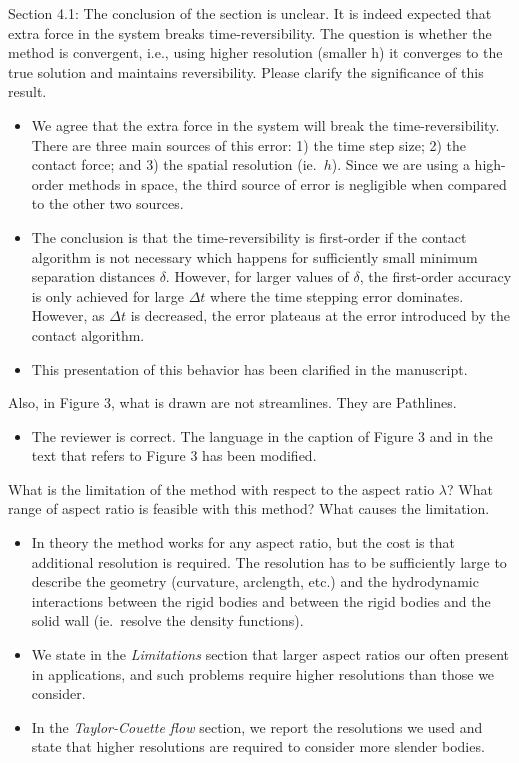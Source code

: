 \documentclass[11pt]{article}
\newcommand{\comment}[1]{{\color{blue} #1}}
\begin{document}
\noindent
\comment{Section 4.1: The conclusion of the section is unclear.  It is
  indeed expected that extra force in the system breaks
  time-reversibility.  The question is whether the method is convergent,
  i.e., using higher resolution (smaller h) it converges to the true
  solution and maintains reversibility.  Please clarify the significance
of this result.}
\begin{itemize}
  \item We agree that the extra force in the system will break the
    time-reversibility.  There are three main sources of this error: 1)
    the time step size; 2) the contact force; and 3) the spatial
    resolution (ie.~$h$).  Since we are using a high-order methods in
    space, the third source of error is negligible when compared to the
    other two sources.

  \item The conclusion is that the time-reversibility is first-order if
    the contact algorithm is not necessary which happens for
    sufficiently small minimum separation distances $\delta$.  However,
    for larger values of $\delta$, the first-order accuracy is only
    achieved for large $\Delta t$ where the time stepping error
    dominates.  However, as $\Delta t$ is decreased, the error plateaus
    at the error introduced by the contact algorithm.

  \item This presentation of this behavior has been clarified in the
    manuscript.
\end{itemize}

\noindent
\comment{Also, in Figure 3, what is drawn are not streamlines.  They are
Pathlines.}
\begin{itemize}
  \item The reviewer is correct.  The language in the caption of Figure
    3 and in the text that refers to Figure 3 has been modified.
\end{itemize}


\noindent
\comment{What is the limitation of the method with respect to the aspect
ratio $\lambda$?  What range of aspect ratio is feasible with this
method?  What causes the limitation.}
\begin{itemize}
  \item In theory the method works for any aspect ratio, but the cost is
    that additional resolution is required.  The resolution has to be
    sufficiently large to describe the geometry (curvature, arclength,
    etc.) and the hydrodynamic interactions between the rigid bodies and
    between the rigid bodies and the solid wall (ie.~resolve the density
    functions).
    
  \item We state in the {\em Limitations} section that larger aspect
    ratios our often present in applications, and such problems require
    higher resolutions than those we consider.

  \item In the {\em Taylor-Couette flow} section, we report the
    resolutions we used and state that higher resolutions are required
    to consider more slender bodies.

\end{itemize}
\end{document}

